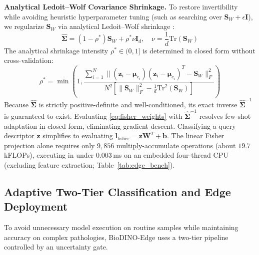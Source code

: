 \documentclass[conference]{IEEEtran}
\begin{document}
\textbf{Analytical Ledoit--Wolf Covariance Shrinkage.} To restore invertibility while avoiding heuristic hyperparameter tuning (such as searching over $\mathbf{S}_W + \epsilon \mathbf{I}$), we regularize $\mathbf{S}_W$ via analytical Ledoit--Wolf shrinkage \cite{ledoit2004well}:
\begin{equation}
    \hat{\mathbf{\Sigma}} = (1 - \rho^*)\mathbf{S}_W + \rho^* \nu \mathbf{I}_{d}, \quad \nu = \frac{1}{d}\text{Tr}(\mathbf{S}_W)
\end{equation}
The analytical shrinkage intensity $\rho^* \in (0, 1]$ is determined in closed form without cross-validation:
\begin{equation}
    \rho^* = \min\left(1, \frac{\sum_{i=1}^N \|(\mathbf{z}_i - \boldsymbol{\mu}_{c_i})(\mathbf{z}_i - \boldsymbol{\mu}_{c_i})^T - \mathbf{S}_W\|_F^2}{N^2 \left[\|\mathbf{S}_W\|_F^2 - \frac{1}{d}\text{Tr}^2(\mathbf{S}_W)\right]}\right)
\end{equation}
Because $\hat{\mathbf{\Sigma}}$ is strictly positive-definite and well-conditioned, its exact inverse $\hat{\mathbf{\Sigma}}^{-1}$ is guaranteed to exist. Evaluating \eqref{eq:fisher_weights} with $\hat{\mathbf{\Sigma}}^{-1}$ resolves few-shot adaptation in closed form, eliminating gradient descent. Classifying a query descriptor $\mathbf{z}$ simplifies to evaluating $\mathbf{l}_{\text{fisher}} = \mathbf{z} \mathbf{W}^T + \mathbf{b}$. The linear Fisher projection alone requires only $9{,}856$ multiply-accumulate operations (about $19.7$\,kFLOPs), executing in under $0.003$\,ms on an embedded four-thread CPU (excluding feature extraction; Table~\ref{tab:edge_bench}).

\subsection{Adaptive Two-Tier Classification and Edge Deployment}
\label{sec:edge_deployment}
To avoid unnecessary model execution on routine samples while maintaining accuracy on complex pathologies, BioDINO-Edge uses a two-tier pipeline controlled by an uncertainty gate.
\end{document}
